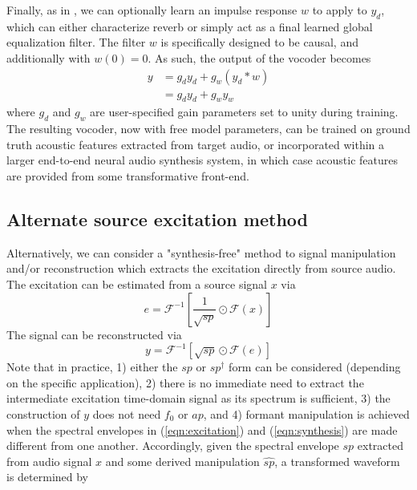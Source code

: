 \documentclass{article}
\begin{document}
\begin{sloppy}
Finally, as in \cite{Ddsp, Shahan3}, we can optionally learn an impulse response $w$ to apply to $y_d$, which can either characterize reverb or simply act as a final learned global equalization filter.  The filter $w$ is specifically designed to be causal, and additionally with $w(0)=0$.  As such, the output of the vocoder becomes
\begin{equation}
\label{eqn:vocoder}
\begin{split}
y & = g_dy_d + g_w\left(y_d*w\right) \\
 & = g_dy_d + g_wy_w
\end{split}
\end{equation}
where $g_d$ and $g_w$ are user-specified gain parameters set to unity during training. The resulting vocoder, now with free model parameters, can be trained on ground truth acoustic features extracted from target audio, or incorporated within a larger end-to-end neural audio synthesis system, in which case acoustic features are provided from some transformative front-end.
 
\subsection{Alternate source excitation method}
\label{ssec:alternate}
Alternatively, we can consider a "synthesis-free" method to signal manipulation and/or reconstruction which extracts the excitation directly from source audio.  The excitation can be estimated from a source signal $x$ via
\begin{equation}
\label{eqn:excitation}
e = \mathcal{F}^{-1}\left[\frac{1}{\sqrt{sp}}\odot\mathcal{F}(x)\right]
\end{equation}
The signal can be reconstructed via
\begin{equation}
\label{eqn:synthesis}
y = \mathcal{F}^{-1}\left[\sqrt{sp}\odot\mathcal{F}(e)\right]
\end{equation}
Note that in practice, 1) either the $sp$ or $sp^\dagger$ form can be considered (depending on the specific application), 2) there is no immediate need to extract the intermediate excitation time-domain signal as its spectrum is sufficient, 3) the construction of $y$ does not need $f_0$ or $ap$, and 4) formant manipulation is achieved when the spectral envelopes in (\ref{eqn:excitation}) and (\ref{eqn:synthesis}) are made different from one another.  Accordingly, given the spectral envelope $sp$ extracted from audio signal $x$ and some derived manipulation $\hat{sp}$, a transformed waveform is determined by


\end{sloppy}
\end{document}
